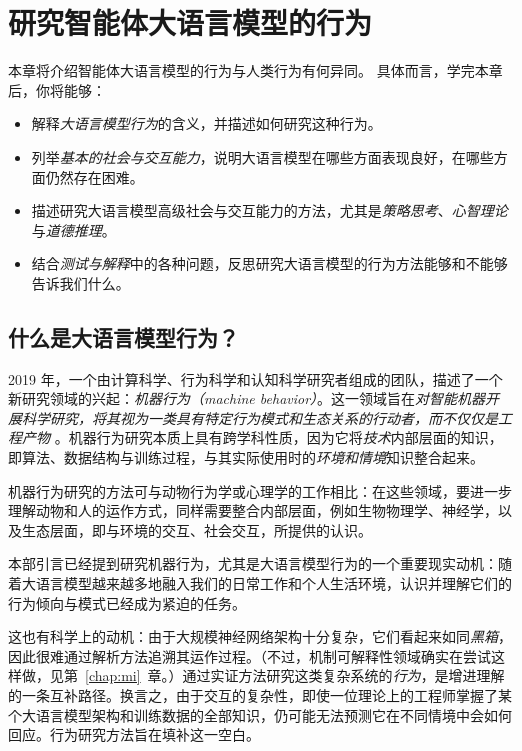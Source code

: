 \chapter{研究智能体大语言模型的行为}\label{chap:behavior}

\begin{learningbox}
本章将介绍智能体大语言模型的行为与人类行为有何异同。
具体而言，学完本章后，你将能够：
\begin{itemize}[leftmargin=*, nosep]
    \item 解释{\em 大语言模型行为}的含义，并描述如何研究这种行为。
    \item 列举{\em 基本的社会与交互能力}，说明大语言模型在哪些方面表现良好，在哪些方面仍然存在困难。
    \item 描述研究大语言模型高级社会与交互能力的方法，尤其是{\em 策略思考}、{\em 心智理论}与{\em 道德推理}。
    \item 结合{\em 测试与解释}中的各种问题，反思研究大语言模型的行为方法能够和不能够告诉我们什么。
\end{itemize}
\end{learningbox}

\section{什么是大语言模型行为？}
2019 年，一个由计算科学、行为科学和认知科学研究者组成的团队，描述了一个新研究领域的兴起：\emph{机器行为（machine behavior）}。这一领域旨在{\em 对智能机器开展科学研究，将其视为一类具有特定行为模式和生态关系的行动者，而不仅仅是工程产物} \citep{rahwan_machine_2019}。机器行为研究本质上具有跨学科性质，因为它将{\em 技术}内部层面的知识，即算法、数据结构与训练过程，与其实际使用时的\emph{环境和情境}知识整合起来。

机器行为研究的方法可与动物行为学或心理学的工作相比：在这些领域，要进一步理解动物和人的运作方式，同样需要整合内部层面，例如生物物理学、神经学，以及生态层面，即与环境的交互、社会交互，所提供的认识。

本部引言已经提到研究机器行为，尤其是大语言模型行为的一个重要现实动机：随着大语言模型越来越多地融入我们的日常工作和个人生活环境，认识并理解它们的行为倾向与模式已经成为紧迫的任务。

这也有科学上的动机：由于大规模神经网络架构十分复杂，它们看起来如同{\em 黑箱}，因此很难通过解析方法追溯其运作过程。（不过，机制可解释性领域确实在尝试这样做，见第~\ref{chap:mi}~章。）通过实证方法研究这类复杂系统的{\em 行为}，是增进理解的一条互补路径。换言之，由于交互的复杂性，即使一位理论上的工程师掌握了某个大语言模型架构和训练数据的全部知识，仍可能无法预测它在不同情境中会如何回应。行为研究方法旨在填补这一空白。

